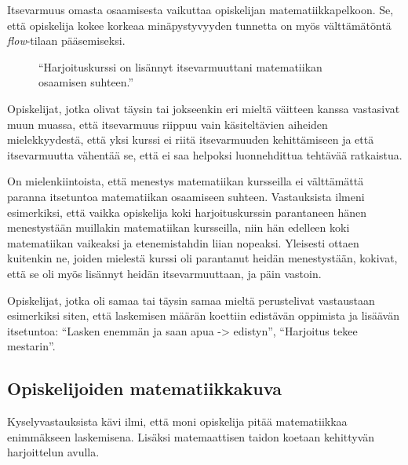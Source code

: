 Itsevarmuus omasta osaamisesta vaikuttaa opiskelijan matematiikkapelkoon.
Se, että opiskelija kokee korkeaa minäpystyvyyden tunnetta on myös välttämätöntä \emph{flow}-tilaan pääsemiseksi.

\begin{figure}[h!]
\centering
{}
\caption{``Harjoituskurssi on lisännyt itsevarmuuttani matematiikan osaamisen suhteen.''}
\end{figure}

Opiskelijat, jotka olivat täysin tai jokseenkin eri mieltä väitteen kanssa vastasivat muun muassa, että itsevarmuus riippuu vain käsiteltävien aiheiden mielekkyydestä, että yksi kurssi ei riitä itsevarmuuden kehittämiseen ja että itsevarmuutta vähentää se, että ei saa helpoksi luonnehdittua tehtävää ratkaistua. 

On mielenkiintoista, että menestys matematiikan kursseilla ei välttämättä paranna itsetuntoa matematiikan osaamiseen suhteen. Vastauksista ilmeni esimerkiksi, että vaikka opiskelija koki harjoituskurssin parantaneen hänen menestystään muillakin matematiikan kursseilla, niin hän edelleen koki matematiikan vaikeaksi ja etenemistahdin liian nopeaksi. Yleisesti ottaen kuitenkin ne, joiden mielestä kurssi oli parantanut heidän menestystään, kokivat, että se oli myös lisännyt heidän itsevarmuuttaan, ja päin vastoin.

Opiskelijat, jotka oli samaa tai täysin samaa mieltä perustelivat vastaustaan esimerkiksi siten, että laskemisen määrän koettiin edistävän oppimista ja lisäävän itsetuntoa: ``Lasken enemmän ja saan apua -> edistyn'', ``Harjoitus tekee mestarin''. 



\subsection{Opiskelijoiden matematiikkakuva}
Kyselyvastauksista kävi ilmi, että moni opiskelija pitää matematiikkaa enimmäkseen laskemisena.
Lisäksi matemaattisen taidon koetaan kehittyvän harjoittelun avulla.

